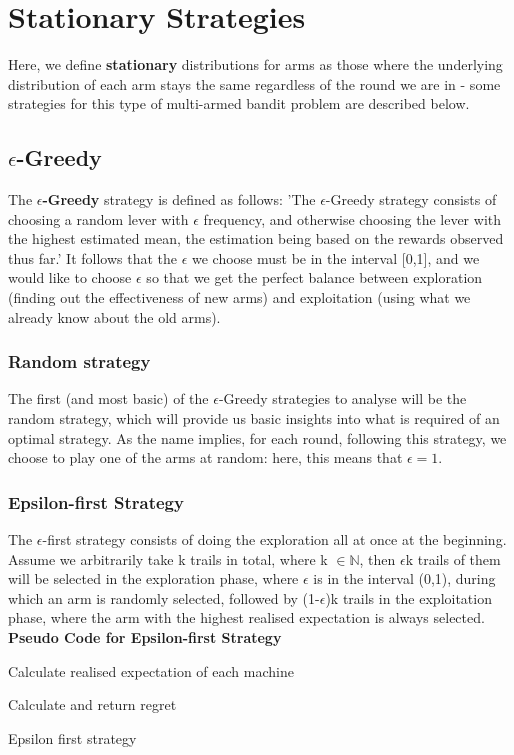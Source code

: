 \section{Stationary Strategies}
Here, we define \textbf{stationary} distributions for arms as those where the underlying distribution of each arm stays the same regardless of the round we are in - some strategies for this type of multi-armed bandit problem are described below.

\subsection{$\epsilon$-Greedy}
The \textbf{$\epsilon$-Greedy} strategy is defined as follows: 'The $\epsilon$-Greedy strategy consists of choosing a random lever with $\epsilon$ frequency, and otherwise choosing the lever with the highest estimated mean, the estimation being based on the rewards observed thus far.' \citep{vermorel} It follows that the $\epsilon$ we choose must be in the interval [0,1], and we would like to choose $\epsilon$ so that we get the perfect balance between exploration (finding out the effectiveness of new arms) and exploitation (using what we already know about the old arms).

\subsubsection{Random strategy}
The first (and most basic) of the $\epsilon$-Greedy strategies to analyse will be the random strategy, which will provide us basic insights into what is required of an optimal strategy. As the name implies, for each round, following this strategy, we choose to play one of the arms at random: here, this means that $\epsilon = 1$.

\subsubsection{Epsilon-first Strategy}

The $\epsilon$-first strategy consists of doing the exploration all at once at the beginning. Assume we arbitrarily take k trails in total, where k $\in \mathbb{N}$, then $\epsilon$k trails of them will be selected in the exploration phase, where $\epsilon$ is in the interval (0,1), during which an arm is randomly selected, followed by (1-$\epsilon$)k trails in the exploitation phase, where the arm with the highest realised expectation is always selected.
\newline
\textbf{Pseudo Code for Epsilon-first Strategy}
\newline
\begin{algorithm}[H]
    Calculate realised expectation of each machine\;

    Calculate and return regret
    \caption{Epsilon first strategy}
\end{algorithm}

